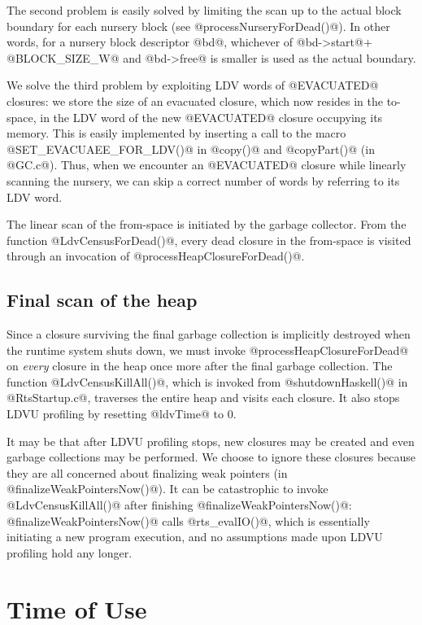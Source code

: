 \documentclass{article}
\begin{document}
The second problem is easily solved by limiting the scan up to the actual
block boundary for each nursery block (see @processNurseryForDead()@).
In other words, for a nursery block descriptor @bd@, 
whichever of @bd->start@$ + $@BLOCK_SIZE_W@ and @bd->free@ is smaller
is used as the actual boundary. 

We solve the third problem by exploiting LDV words of @EVACUATED@ closures:
we store the size of an evacuated closure, which now resides in the to-space,
in the LDV word of the new @EVACUATED@ closure occupying its memory.
This is easily implemented by inserting a call to the macro
@SET_EVACUAEE_FOR_LDV()@ in @copy()@ and @copyPart()@ (in @GC.c@).
Thus, when we encounter an @EVACUATED@ closure while linearly scanning the
nursery, we can skip a correct number of words by referring to its LDV word.

The linear scan of the from-space is initiated by the garbage collector.
From the function @LdvCensusForDead()@, every dead closure in the from-space is
visited through an invocation of @processHeapClosureForDead()@.

\subsection{Final scan of the heap}

Since a closure surviving the final garbage collection is implicitly destroyed
when the runtime system shuts down, we must invoke @processHeapClosureForDead@
on \emph{every} closure in the heap once more after the final garbage collection.
The function @LdvCensusKillAll()@, which is invoked from @shutdownHaskell()@
in @RtsStartup.c@, traverses the entire heap and visits each closure.
It also stops LDVU profiling by resetting @ldvTime@ to $0$. 

It may be that after LDVU profiling stops, new closures may be created
and even garbage collections may be performed.
We choose to ignore these closures because they are all concerned about
finalizing weak pointers (in @finalizeWeakPointersNow()@).
It can be catastrophic to invoke @LdvCensusKillAll()@ after finishing
@finalizeWeakPointersNow()@: @finalizeWeakPointersNow()@ calls
@rts_evalIO()@, which is essentially initiating a new program execution,
and no assumptions made upon LDVU profiling hold any longer. 

\section{Time of Use}
\end{document}
